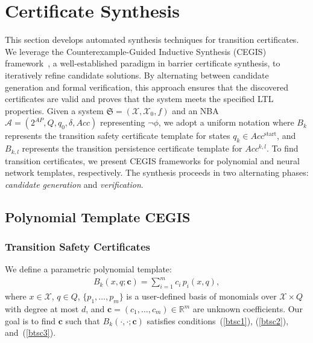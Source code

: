\section{Certificate Synthesis}
\label{sec:synthesis}
This section develops automated synthesis techniques for transition certificates. We leverage the Counterexample-Guided Inductive Synthesis (CEGIS) framework~\cite{solar2008program}, a well-established paradigm in barrier certificate synthesis, to iteratively refine candidate solutions. By alternating between candidate generation and formal verification, this approach ensures that the discovered certificates are valid and proves that the system meets the specified LTL properties. Given a system $\mathfrak{S} = (\mathcal{X}, \mathcal{X}_0, f)$ and an NBA $\mathcal{A} = (2^{AP}, Q, q_0, \delta, Acc)$ representing $\neg \phi$, we adopt a uniform notation where $B_k$ represents the transition safety certificate template for states $q_k \in Acc^{\text{start}}$, and $B_{k,l}$ represents the transition persistence certificate template for $Acc^{k,l}$. To find transition certificates, we present CEGIS frameworks for polynomial and neural network templates, respectively. The synthesis proceeds in two alternating phases: \textit{candidate generation} and \textit{verification}.

\subsection{Polynomial Template CEGIS}
\subsubsection{Transition Safety Certificates} 
We define a parametric polynomial template:
\begin{align}
B_k(x, q; \mathbf{c}) = \sum_{i=1}^{m} c_i \, p_i(x, q),
\end{align}
where $x \in \mathcal{X}$, $q \in Q$, $\{p_1, \ldots, p_m\}$ is a user-defined basis of monomials over $\mathcal{X} \times Q$ with degree at most $d$, and $\mathbf{c} = (c_1, \ldots, c_m) \in \mathbb{R}^m$ are unknown coefficients. Our goal is to find $\mathbf{c}$ such that $B_k(\cdot, \cdot; \mathbf{c})$ satisfies conditions~(\ref{btsc1}), (\ref{btsc2}), and~(\ref{btsc3}). 

